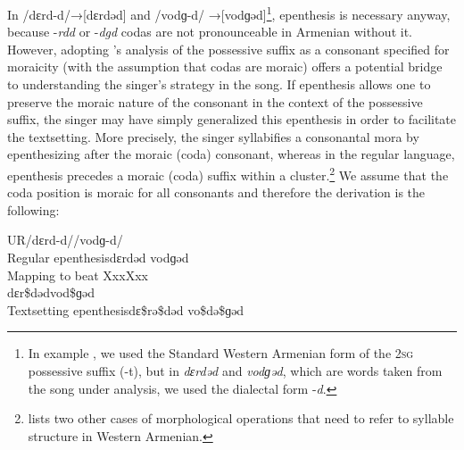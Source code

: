 \documentclass[output=paper,colorlinks,citecolor=brown]{langscibook}
\begin{document}
In /dɛrd{}-d/→[dɛrdəd] and /vodɡ-d/ →[vodɡəd]\footnote{In example , we used the Standard Western Armenian form of the 2\textsc{sg} possessive suffix (-t), but in \textit{dɛrdəd} and \textit{vodɡəd}, which are words taken from the song under analysis, we used the dialectal form -\textit{d}.}, epenthesis is necessary anyway, because -\textit{rdd} or -\textit{dgd} codas are not pronounceable in Armenian without it.  However, adopting \citet{Baronian2017}'s analysis of the possessive suffix as a consonant specified for moraicity (with the assumption that codas are moraic) offers a potential bridge to understanding the singer’s strategy in the song.  If epenthesis allows one to preserve the moraic nature of the consonant in the context of the possessive suffix, the singer may have simply generalized this epenthesis in order to facilitate the textsetting.  More precisely, the singer syllabifies a consonantal mora by epenthesizing after the moraic (coda) consonant, whereas in the regular language, epenthesis precedes a moraic (coda) suffix within a cluster.\footnote{\citet{Baronian2017} lists two other cases of morphological operations that need to refer to syllable structure in Western Armenian.}  We assume that the coda position is moraic for all consonants and therefore the derivation is the following:

\begin{exe}
    \ex UR\tab \tab	\tab	\tab		/dɛrd-d/\tab \tab	\tab		/vodɡ-d/\\
    Regular epenthesis\tab \tab		dɛrdəd	\tab \tab	\tab		vodɡəd\\
    Mapping to beat	\tab \tab	X\tab  	x\tab	x\tab	\tab	X\tab	x\tab	x\\
    \tab \tab \tab \tab \tab dɛ\tab  r\$\tab  dəd\tab \tab    vo\tab  d\$\tab  ɡəd\\
    Textsetting epenthesis\tab  dɛ\$\tab  rə\$\tab  dəd \tab \tab   vo\$\tab  də\$\tab  ɡəd
\end{exe}
\end{document}
